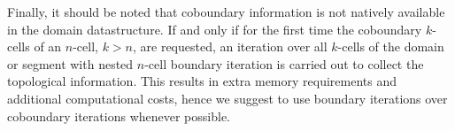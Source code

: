 Finally, it should be noted that coboundary information is not natively available in the domain datastructure. If and only if for the first time
the coboundary $k$-cells of an $n$-cell, $k>n$, are requested, an iteration over all $k$-cells of the domain or segment with nested $n$-cell boundary iteration is carried out to collect the topological information.
This results in extra memory requirements and additional computational costs, hence we suggest to use boundary iterations over coboundary iterations whenever possible.





